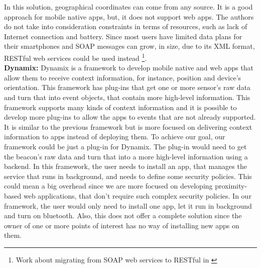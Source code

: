 In this solution, geographical coordinates can
come from any source. It is a good approach for
mobile native apps, but, it does not support web apps.
The authors do not take into consideration
constraints in terms of resources, such as
lack of Internet connection and battery.
Since most users have limited data plans for
their smartphones and SOAP messages can
grow, in size, due to its XML format,
RESTful \cite{richardson2008restful}
web services could be used instead
\footnote{Work about migrating from SOAP web services
to RESTful in \cite{upadhyaya2011migration}}.
\\
\textbf{Dynamix:}
Dynamix \cite{Carlson2012} is a framework to develop
mobile native and web apps that allow them to receive
context information, for instance, position and device's
orientation. This framework has plug-ins that get
one or more sensor's raw data and turn that into event
objects, that contain more high-level information.
This framework supports many kinds of context information
and it is possible to develop more plug-ins to allow the
apps to events that are not
already supported. It is similar to the previous
framework but is more focused on delivering context
information to apps instead of deploying them.
To achieve our goal, our framework could be just a
plug-in for Dynamix. The plug-in would
need to get the beacon's raw data and
turn that into a more high-level information 
using a backend. In this framework,
the user needs to install an app, that manages the service
that runs in background, and needs to define some
security policies. This could mean a big overhead since
we are more focused on developing proximity-based
web applications, that don't require such complex security
policies. In our framework, the user would only need to
install one app, let it run in background and turn on
bluetooth. Also, this does not offer a complete solution
since the owner of one or more points of interest
has no way of installing new apps on them.

